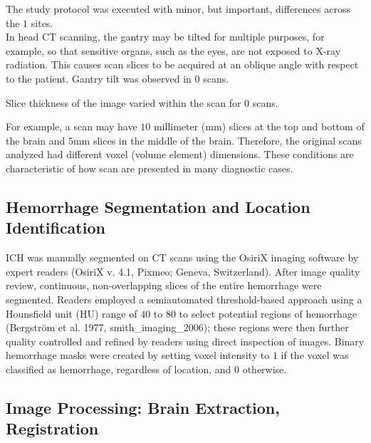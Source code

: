 \documentclass[]{elsarticle} %
\begin{document}
The study protocol was executed with minor, but important, differences
across the \(1\) sites.\\
 In head CT scanning, the gantry may be tilted for multiple purposes,
for example, so that sensitive organs, such as the eyes, are not exposed
to X-ray radiation. This causes scan slices to be acquired at an oblique
angle with respect to the patient. Gantry tilt was observed in \(0\)
scans.

Slice thickness of the image varied within the scan for 0 scans.

For example, a scan may have \(10\) millimeter (mm) slices at the top
and bottom of the brain and \(5\)mm slices in the middle of the brain.
Therefore, the original scans analyzed had different voxel (volume
element) dimensions. These conditions are characteristic of how scan are
presented in many diagnostic cases.

\hypertarget{hemorrhage-segmentation-and-location-identification}{%
\subsection{Hemorrhage Segmentation and Location
Identification}\label{hemorrhage-segmentation-and-location-identification}}

ICH was manually segmented on CT scans using the OsiriX imaging software
by expert readers (OsiriX v. 4.1, Pixmeo; Geneva, Switzerland). After
image quality review, continuous, non-overlapping slices of the entire
hemorrhage were segmented. Readers employed a semiautomated
threshold-based approach using a Hounsfield unit (HU) range of \(40\) to
\(80\) to select potential regions of hemorrhage (Bergström et al. 1977,
smith\_imaging\_2006); these regions were then further quality
controlled and refined by readers using direct inspection of images.
Binary hemorrhage masks were created by setting voxel intensity to \(1\)
if the voxel was classified as hemorrhage, regardless of location, and
\(0\) otherwise.

\hypertarget{image-processing-brain-extraction-registration}{%
\subsection{Image Processing: Brain Extraction,
Registration}\label{image-processing-brain-extraction-registration}}
\end{document}
